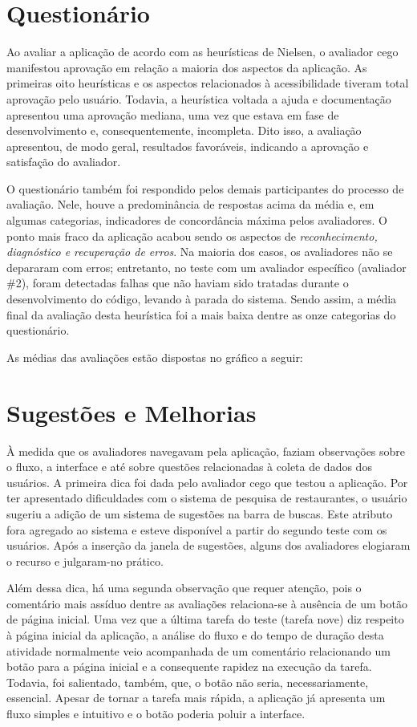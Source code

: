 \section{Questionário}

Ao avaliar a aplicação de acordo com as heurísticas de Nielsen, o avaliador cego manifestou aprovação em relação a maioria dos aspectos da aplicação.  As primeiras oito heurísticas e os aspectos relacionados à acessibilidade tiveram total aprovação pelo usuário. Todavia, a heurística voltada a ajuda e documentação apresentou uma aprovação mediana, uma vez que estava em fase de desenvolvimento e, consequentemente, incompleta. Dito isso, a avaliação apresentou, de modo geral, resultados favoráveis, indicando a aprovação e satisfação do avaliador.

O questionário também foi respondido pelos demais participantes do processo de avaliação. Nele, houve a predominância de respostas acima da média e, em algumas categorias, indicadores de concordância máxima pelos avaliadores. O ponto mais fraco da aplicação acabou sendo os aspectos de \emph{reconhecimento, diagnóstico e recuperação de erros}. Na maioria dos casos, os avaliadores não se depararam com erros; entretanto, no teste com um avaliador específico (avaliador \#2), foram detectadas falhas que não haviam sido tratadas durante o desenvolvimento do código, levando à parada do sistema. Sendo assim, a média final da avaliação desta heurística foi a mais baixa dentre as onze categorias do questionário.

As médias das avaliações estão dispostas no gráfico a seguir:
\color{blue}
\section{\label{sec:sugestoes}Sugestões e Melhorias}

À medida que os avaliadores navegavam pela aplicação, faziam observações sobre o fluxo, a interface e até sobre questões relacionadas à coleta de dados dos usuários. A primeira dica foi dada pelo avaliador cego que testou a aplicação. Por ter apresentado dificuldades com o sistema de pesquisa de restaurantes, o usuário sugeriu a adição de um sistema de sugestões na barra de buscas. Este atributo fora agregado ao sistema e esteve disponível a partir do segundo teste com os usuários. Após a inserção da janela de sugestões, alguns dos avaliadores elogiaram o recurso e julgaram-no prático.

Além dessa dica, há uma segunda observação que requer atenção, pois o comentário mais assíduo dentre as avaliações relaciona-se à ausência de um botão de página inicial. Uma vez que a última tarefa do teste (tarefa nove) diz respeito à página inicial da aplicação, a análise do fluxo e do tempo de duração desta atividade normalmente veio acompanhada de um comentário relacionando um botão para a página inicial e a consequente rapidez na execução da tarefa. Todavia, foi salientado, também, que, o botão não seria, necessariamente, essencial. Apesar de tornar a tarefa mais rápida, a aplicação já apresenta um fluxo simples e intuitivo e o botão poderia poluir a interface.

